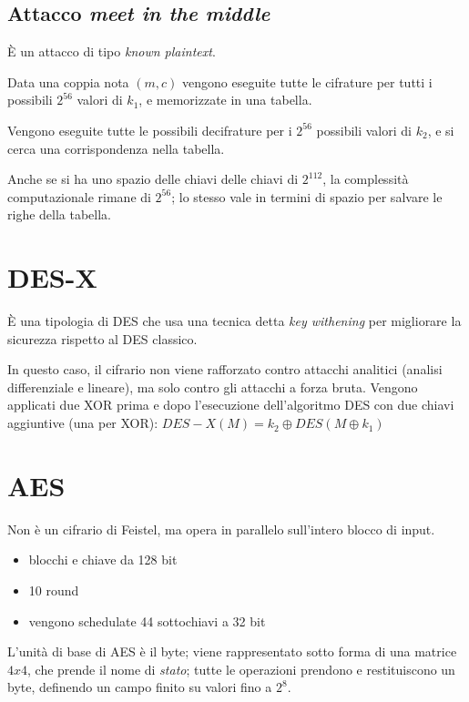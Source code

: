\subsection{Attacco \textit{meet in the middle}}

È un attacco di tipo \textit{known plaintext}.

\noindent Data una coppia nota $(m, c)$ vengono eseguite tutte le cifrature 
per tutti i possibili $2^{56}$ valori di $k_1$, e memorizzate in una tabella.

\noindent Vengono eseguite tutte le possibili decifrature per i $2^{56}$ possibili 
valori di $k_2$, e si cerca una corrispondenza nella tabella.

\noindent Anche se si ha uno spazio delle chiavi delle chiavi di $2^{112}$, la complessità computazionale 
rimane di $2^{56}$; lo stesso vale in termini di spazio per salvare le righe 
della tabella.

\section{DES-X}


È una tipologia di DES che usa una tecnica detta \textit{key withening} per migliorare la sicurezza rispetto al DES classico. 

\noindent In questo
caso, il cifrario non viene rafforzato contro attacchi analitici (analisi differenziale e lineare), ma solo contro gli attacchi
a forza bruta. Vengono applicati due XOR prima e dopo l’esecuzione dell’algoritmo DES con due chiavi aggiuntive
(una per XOR): $DES-X(M)=k_2 \oplus DES(M \oplus k_1)$ 


\section{AES}

Non è un cifrario di Feistel, ma opera in parallelo sull'intero blocco 
di input.
\begin{itemize}
    \item blocchi e chiave da 128 bit 
    \item 10 round 
    \item vengono schedulate 44 sottochiavi a 32 bit 
\end{itemize}

\noindent L'unità di base di AES è il byte; viene rappresentato sotto forma di una matrice 
$4x4$, che prende il nome di \textit{stato}; tutte le operazioni prendono e restituiscono un byte, definendo 
un campo finito su valori fino a $2^8$.

